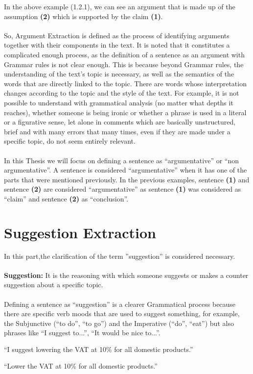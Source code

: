 In the above example (1.2.1), we can see an argument that is made up of the assumption \textbf{(2)} which is supported by the claim \textbf{(1)}.\\
\\
So, Argument Extraction is defined as the process of identifying arguments together with their components in the text. It is noted that it constitutes a complicated enough process, as the definition of a sentence as an argument with Grammar rules is not clear enough. This is because beyond Grammar rules, the understanding of the text's topic is necessary, as well as the semantics of the words that are directly linked to the topic. There are words whose interpretation changes according to the topic and the style of the text. For example, it is not possible to understand with grammatical analysis (no matter what depths it reaches), whether someone is being ironic or whether a phrase is used in a literal or a figurative sense, let alone in comments which are basically unstructured, brief and with many errors that many times, even if they are made under a specific topic, do not seem entirely relevant.\\
\\
In this Thesis we will focus on defining a sentence as ``argumentative'' or ``non argumentative''. A sentence is considered ``argumentative'' when it has one of the parts that were mentioned previously. In the previous examples, sentence \textbf{(1)} and sentence \textbf{(2)} are considered ``argumentative'' as sentence \textbf{(1)} was considered as ``claim'' and sentence \textbf{(2)} as ``conclusion''.

\section{Suggestion Extraction}
In this part,the clarification of the term ''suggestion'' is considered necessary.\\
\\
\textbf{Suggestion:} It is the reasoning with which someone suggests or makes a counter suggestion about a specific topic.\\
\\
Defining a sentence as ``suggestion'' is a clearer Grammatical process because there are specific verb moods that are used to suggest something, for example, the Subjunctive (``to do'', ``to go'') and the  Imperative (``do'', ``eat'') but also phrases like ``I suggest  to...'', ``It would be nice to...''.\\
\begin{example}
	``I suggest lowering the VAT at 10\% for all domestic products.''\\
\end{example}
\begin{example}
	``Lower the VAT at 10\% for all domestic products.''\\
\end{example}

